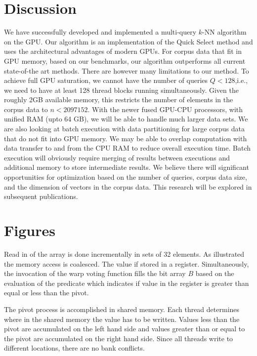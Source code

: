 \documentclass[10pt]{article}
\begin{document}
\section*{Discussion} We have successfully developed and implemented a multi-query $k$-NN algorithm on the GPU. Our algorithm is an implementation of the Quick Select method and uses the architectural advantages of modern GPUs. For corpus data that fit in GPU memory, based on our benchmarks, our algorithm outperforms all current state-of-the art methods. There are however many limitations to our method. To achieve full GPU saturation, we cannot have the number of queries $Q<128$,i.e., we need to have at least 128 thread blocks running simultaneously. Given the roughly 2GB available memory, this restricts the number of elements in the corpus data to $n<2097152$.  With the newer fused GPU-CPU processors, with unified RAM (upto 64 GB), we will be able to handle much larger data sets.  We are also looking at batch execution with data partitioning for large corpus data that do not fit into GPU memory. We may be able to overlap computation with data transfer to and from the CPU RAM to reduce overall execution time.  Batch execution will obviously require merging of results between executions and additional memory to store intermediate results. We believe there will significant opportunities for optimization based on the number of queries, corpus data size, and the dimension of vectors in the corpus data. This research will be explored in subsequent publications.

\section*{Figures}
  Read in of the array is done incrementally in sets of 32 elements. As illustrated the memory access is coalesced. The value if stored in a register. Simultaneously, the invocation of the warp voting function fills the bit array $B$ based on the evaluation of the predicate which indicates if value in the register is greater than equal or less than the pivot.

 The pivot process is accomplished in shared memory. Each thread determines where in the shared memory the value has to be written. Values less than the pivot are accumulated on the left hand side and values greater than or equal to the pivot are accumulated on the right hand side. Since all threads write to different locations, there are no bank conflicts.
\end{document}
